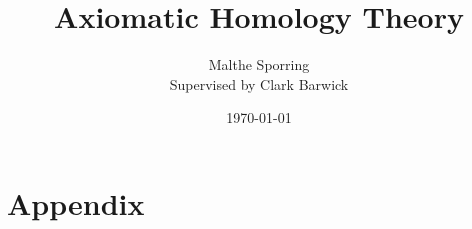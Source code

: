 \documentclass[titlepage,12pt,a4paper]{article}
\title{Axiomatic Homology Theory}
\author{Malthe Sporring\\ Supervised by Clark Barwick}
\date{\today}
\numberwithin{thm}{section}
\theoremstyle{plain}
\theoremstyle{definition}
\begin{document}
\maketitle


\tableofcontents
\newpage











\section{Appendix}

\newpage
\end{document}
